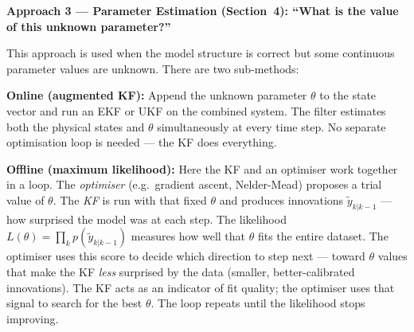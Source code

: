 \documentclass[12pt, a4paper]{article}
\begin{document}
\vspace{6pt}

\begin{keybox}
  \textbf{Approach 3 --- Parameter Estimation (Section~4):
  ``What is the value of this unknown parameter?''}

  This approach is used when the model structure is correct but some
  continuous parameter values are unknown.
  There are two sub-methods:

  \textbf{Online (augmented KF):}
  Append the unknown parameter $\theta$ to the state vector and run an
  EKF or UKF on the combined system.
  The filter estimates both the physical states and $\theta$
  simultaneously at every time step.
  No separate optimisation loop is needed --- the KF does everything.

  \textbf{Offline (maximum likelihood):}
  Here the KF and an optimiser work together in a loop.
  The \emph{optimiser} (e.g.\ gradient ascent, Nelder-Mead) proposes a
  trial value of $\theta$.
  The \emph{KF} is run with that fixed $\theta$ and produces innovations
  $\tilde{y}_{k|k-1}$ --- how surprised the model was at each step.
  The likelihood $L(\theta) = \prod_k p(\tilde{y}_{k|k-1})$ measures
  how well that $\theta$ fits the entire dataset.
  The optimiser uses this score to decide which direction to step next
  --- toward $\theta$ values that make the KF \emph{less} surprised by
  the data (smaller, better-calibrated innovations).
  The KF acts as an indicator of fit quality; the optimiser uses that
  signal to search for the best $\theta$.
  The loop repeats until the likelihood stops improving.
\end{keybox}
\end{document}
